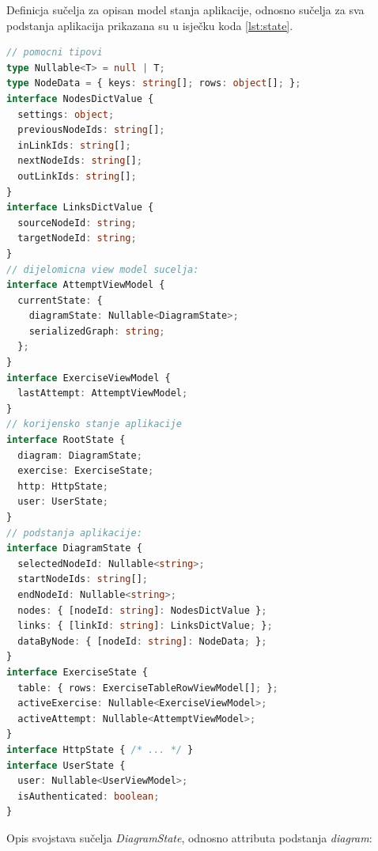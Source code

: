 \documentclass[times, utf8, diplomski, numeric]{fer}
\newcommand{\razmakp}{\vspace{18pt}}
\newcommand{\razmaks}{\vspace{10pt}}
\begin{document}
\razmakp

Definicja sučelja za opisan model stanja aplikacije, odnosno sučelja za sva podstanja aplikacija prikazana su u isječku koda \ref{lst:state}.

\razmakp %
\begin{lstlisting}[language=TypeScript, caption={Pojednostavljena verzija sučelja stanja aplikacije}, label={lst:state}]
// pomocni tipovi
type Nullable<T> = null | T;
type NodeData = { keys: string[]; rows: object[]; };
interface NodesDictValue {
  settings: object;
  previousNodeIds: string[];
  inLinkIds: string[];
  nextNodeIds: string[];
  outLinkIds: string[];
}
interface LinksDictValue {
  sourceNodeId: string;
  targetNodeId: string;
}
// dijelomicna view model sucelja:
interface AttemptViewModel {
  currentState: {
    diagramState: Nullable<DiagramState>;
    serializedGraph: string;
  };
}
interface ExerciseViewModel {
  lastAttempt: AttemptViewModel;
}
// korijensko stanje aplikacije
interface RootState {
  diagram: DiagramState;
  exercise: ExerciseState;
  http: HttpState;
  user: UserState;
}
// podstanja aplikacije:
interface DiagramState {
  selectedNodeId: Nullable<string>;
  startNodeIds: string[];
  endNodeId: Nullable<string>;
  nodes: { [nodeId: string]: NodesDictValue };
  links: { [linkId: string]: LinksDictValue; };
  dataByNode: { [nodeId: string]: NodeData; };
}
interface ExerciseState {
  table: { rows: ExerciseTableRowViewModel[]; };
  activeExercise: Nullable<ExerciseViewModel>;
  activeAttempt: Nullable<AttemptViewModel>;
}
interface HttpState { /* ... */ }
interface UserState {
  user: Nullable<UserViewModel>;
  isAuthenticated: boolean;
}
\end{lstlisting}
\razmaks

\noindent Opis svojstava sučelja \emph{DiagramState}, odnosno attributa podstanja \emph{diagram}:
\end{document}
